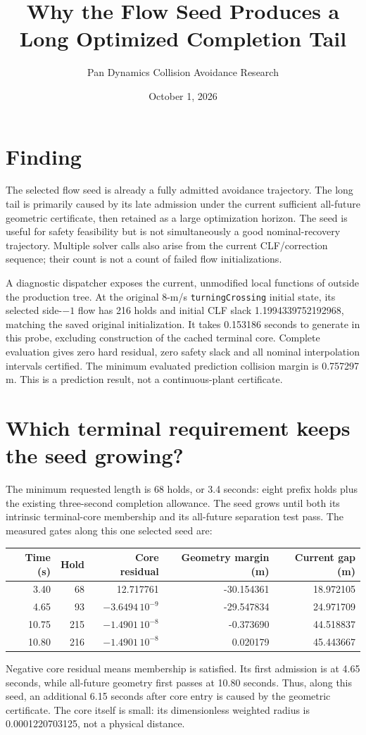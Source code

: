 \documentclass[11pt]{article}
\title{Why the Flow Seed Produces a Long Optimized Completion Tail}
\author{Pan Dynamics Collision Avoidance Research}
\date{October 1, 2026}
\begin{document}
\maketitle

\section{Finding}
The selected flow seed is already a fully admitted avoidance trajectory. The
long tail is primarily caused by its late admission under the current sufficient
all-future geometric certificate, then retained as a large optimization horizon.
The seed is useful for safety feasibility but is not simultaneously a good
nominal-recovery trajectory. Multiple solver calls also arise from the current
CLF/correction sequence; their count is not a count of failed flow initializations.

A diagnostic dispatcher exposes the current, unmodified local functions of
 outside the production tree. At the
original 8-m/s \texttt{turningCrossing} initial state, its selected side-$-1$
flow has 216 holds and initial CLF slack 1.1994339752192968, matching the saved
original initialization. It takes 0.153186 seconds to generate in this probe,
excluding construction of the cached terminal core. Complete evaluation gives
zero hard residual, zero safety slack and all nominal interpolation intervals
certified. The minimum evaluated prediction collision margin is 0.757297 m.
This is a prediction result, not a continuous-plant certificate.

\section{Which terminal requirement keeps the seed growing?}
The minimum requested length is 68 holds, or 3.4 seconds: eight prefix holds
plus the existing three-second completion allowance. The seed grows until both
its intrinsic terminal-core membership and its all-future separation test pass.
The measured gates along this one selected seed are:
\begin{center}
\begin{tabular}{rrrrr}
\toprule
Time (s) & Hold & Core residual & Geometry margin (m) & Current gap (m) \\
\midrule
3.40 & 68 & 12.717761 & -30.154361 & 18.972105 \\
4.65 & 93 & $-3.6494\,10^{-9}$ & -29.547834 & 24.971709 \\
10.75 & 215 & $-1.4901\,10^{-8}$ & -0.373690 & 44.518837 \\
10.80 & 216 & $-1.4901\,10^{-8}$ & 0.020179 & 45.443667 \\
\bottomrule
\end{tabular}
\end{center}
Negative core residual means membership is satisfied. Its first admission is
at 4.65 seconds, while all-future geometry first passes at 10.80 seconds.
Thus, along this seed, an additional 6.15 seconds after core entry is caused
by the geometric certificate. The core itself is small: its dimensionless
weighted radius is 0.0001220703125, not a physical distance.
\end{document}
